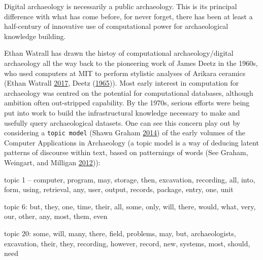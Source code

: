 \documentclass[english,]{book}
\begin{document}
Digital archaeology is necessarily a public archaeology. This is its
principal difference with what has come before, for never forget, there
has been at least a half-century of innovative use of computational
power for archaeological knowledge building.

Ethan Watrall has drawn the histoy of computational archaeology/digital
archaeology all the way back to the pioneering work of James Deetz in
the 1960s, who used computers at MIT to perform stylistic analyses of
Arikara ceramics (Ethan Watrall
\protect\hyperlink{ref-watrall_archaeology_2017}{2017}, Deetz
(\protect\hyperlink{ref-deetz_dynamics_1965}{1965})). Most early
interest in computation for archaeology was centred on the potential for
computational databases, although ambition often out-stripped
capability. By the 1970s, serious efforts were being put into work to
build the infrastructural knowledge necessary to make and usefully query
archaeological datasets. One can see this concern play out by
considering a \texttt{topic\ model} (Shawn Graham
\protect\hyperlink{ref-shawn_graham_digital_2014}{2014}) of the early
volumes of the Computer Applications in Archaeology (a topic model is a
way of deducing latent patterns of discourse within text, based on
patternings of words (See Graham, Weingart, and Milligan
\protect\hyperlink{ref-graham_getting_2012}{2012})):

topic 1 -- computer, program, may, storage, then, excavation, recording,
all, into, form, using, retrieval, any, user, output, records, package,
entry, one, unit

topic 6: but, they, one, time, their, all, some, only, will, there,
would, what, very, our, other, any, most, them, even

topic 20: some, will, many, there, field, problems, may, but,
archaeologists, excavation, their, they, recording, however, record,
new, systems, most, should, need
\end{document}
